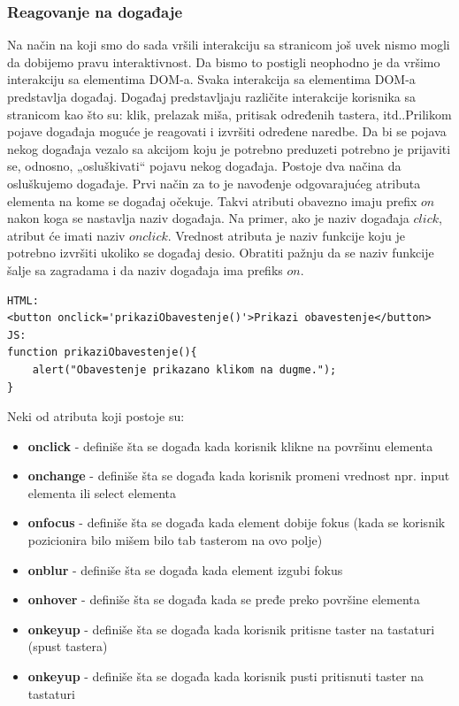 \documentclass[a4paper]{article}
\begin{document}
\subsubsection{Reagovanje na događaje}
Na način na koji smo do sada vršili interakciju sa stranicom još uvek nismo mogli da dobijemo pravu interaktivnost. Da bismo to postigli neophodno je da vršimo interakciju sa elementima DOM-a.
Svaka interakcija sa elementima DOM-a predstavlja događaj. Događaj predstavljaju različite interakcije korisnika sa stranicom kao što su: klik, prelazak miša, pritisak određenih tastera, itd..Prilikom pojave događaja moguće je reagovati i izvršiti određene naredbe. Da bi se pojava nekog događaja vezalo sa akcijom koju je potrebno preduzeti potrebno je prijaviti se, odnosno, „osluškivati“ pojavu nekog događaja.  Postoje dva načina da osluškujemo događaje. Prvi način za to je navođenje odgovarajućeg atributa elementa na kome se događaj očekuje. Takvi atributi obavezno imaju prefix $on$ nakon koga se nastavlja naziv događaja. Na primer, ako je naziv događaja $click$, atribut će imati naziv $onclick$. Vrednost atributa je naziv funkcije koju je potrebno izvršiti ukoliko se događaj desio. Obratiti pažnju da se naziv funkcije šalje sa zagradama i da naziv događaja ima prefiks $on$.
\begin{lstlisting}[backgroundcolor = \color{lightgray}]
HTML:
<button onclick='prikaziObavestenje()'>Prikazi obavestenje</button>
JS:
function prikaziObavestenje(){
	alert("Obavestenje prikazano klikom na dugme.");
}
\end{lstlisting}
Neki od atributa koji postoje su: 
\begin{itemize}
\item \textbf{onclick} - definiše šta se događa kada korisnik klikne na površinu elementa 
\item \textbf{onchange} -  definiše šta se događa kada korisnik promeni vrednost npr. input elementa ili select elementa
\item \textbf{onfocus} - definiše šta se događa kada element dobije fokus (kada se korisnik pozicionira bilo mišem bilo tab tasterom na ovo polje)
\item \textbf{onblur} - definiše šta se događa kada element izgubi fokus
\item \textbf{onhover} - definiše šta se događa kada se pređe preko površine elementa 
\item \textbf{onkeyup} - definiše šta se događa kada korisnik pritisne taster na tastaturi (spust tastera) 
\item \textbf{onkeyup} - definiše šta se događa kada korisnik pusti pritisnuti taster na tastaturi 
\end{itemize}                        
 
\end{document}
